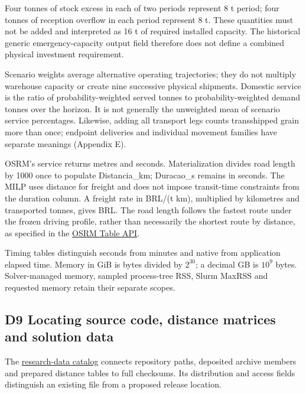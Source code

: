 \documentclass[
  english,
  11pt,
  a4paper,
]{article}
\begin{document}
Four tonnes of stock excess in each of two periods represent 8 t period;
four tonnes of reception overflow in each period represent 8 t. These
quantities must not be added and interpreted as 16 t of required
installed capacity. The historical generic emergency-capacity output
field therefore does not define a combined physical investment
requirement.

Scenario weights average alternative operating trajectories; they do not
multiply warehouse capacity or create nine successive physical
shipments. Domestic service is the ratio of probability-weighted served
tonnes to probability-weighted demand tonnes over the horizon. It is not
generally the unweighted mean of scenario service percentages. Likewise,
adding all transport legs counts transshipped grain more than once;
endpoint deliveries and individual movement families have separate
meanings (Appendix E).

OSRM's service returns metres and seconds. Materialization divides road
length by 1000 once to populate Distancia\_km; Duracao\_s remains in
seconds. The MILP uses distance for freight and does not impose
transit-time constraints from the duration column. A freight rate in
BRL/(t km), multiplied by kilometres and transported tonnes, gives BRL.
The road length follows the fastest route under the frozen driving
profile, rather than necessarily the shortest route by distance, as
specified in the
\href{https://project-osrm.org/docs/v5.24.0/api/\#table-service}{OSRM
Table API}.

Timing tables distinguish seconds from minutes and native from
application elapsed time. Memory in GiB is bytes divided by \(2^{30}\);
a decimal GB is \(10^9\) bytes. Solver-managed memory, sampled
process-tree RSS, Slurm MaxRSS and requested memory retain their
separate scopes.

\subsection{D9 Locating source code, distance matrices and solution
data}\label{d9-locating-source-code-distance-matrices-and-solution-data}

The
\href{https://github.com/unb-lamfo-or-ai-hpc/model-agrologistic/blob/43acc42ffce0350cbce6fdc4b0632529a503547d/data/manifests/research_data_distribution_v1.json}{research-data
catalog} connects repository paths, deposited archive members and
prepared distance tables to full checksums. Its distribution and access
fields distinguish an existing file from a proposed release location.
\end{document}
